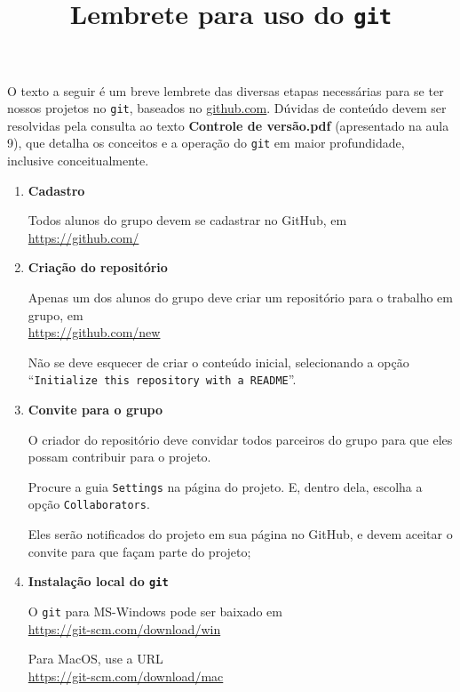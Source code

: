 \documentclass[10pt,a4paper]{article}
\title{Lembrete para uso do {\tt git}}
\begin{document}
\maketitle


\noindent
O texto a seguir é um breve lembrete das diversas etapas necessárias para se ter nossos projetos no 
{\tt git}, baseados no \url{github.com}. Dúvidas de conteúdo devem ser resolvidas pela consulta ao 
texto {\bf Controle de versão.pdf} (apresentado na aula 9), que detalha os conceitos e a operação do 
{\tt git} em maior profundidade, inclusive conceitualmente.

\begin{enumerate}
	\item {\bf Cadastro}

		Todos alunos do grupo devem se cadastrar no GitHub, em \\
		\url{https://github.com/}

	\item {\bf Criação do repositório}

		Apenas um dos alunos do grupo deve criar um repositório para o trabalho em grupo, em \\
		\url{https://github.com/new}

		Não se deve esquecer de criar o conteúdo inicial, selecionando a opção \\
		``{\tt Initialize this repository with a README}''. 
                
	\item {\bf Convite para o grupo}

		O criador do repositório deve convidar todos parceiros do grupo para que eles possam contribuir para o projeto. 
		
		Procure a guia {\tt Settings} na página do projeto. E, dentro dela, escolha a opção  {\tt Collaborators}.

		Eles serão notificados do projeto em sua página no GitHub, e devem aceitar o convite para que façam parte do projeto;
                
	\item {\bf Instalação local do {\tt git}}
	
		O {\tt git} para MS-Windows pode ser baixado em \\
		\url{https://git-scm.com/download/win}

		Para MacOS, use a URL\\
        \url{https://git-scm.com/download/mac}


\end{enumerate}
\end{document}
